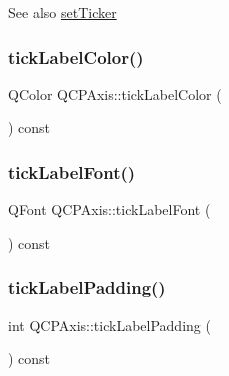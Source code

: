 \begin{DoxySeeAlso}{See also}
\mbox{\hyperlink{class_q_c_p_axis_a4ee03fcd2c74d05cd1a419b9af5cfbdc}{set\+Ticker}} 
\end{DoxySeeAlso}
\mbox{\label{class_q_c_p_axis_a9e21b2326bb2de0b7a8efcd1efc0ce78}} 
\subsubsection{\texorpdfstring{tickLabelColor()}{tickLabelColor()}}
{\footnotesize\ttfamily Q\+Color Q\+C\+P\+Axis\+::tick\+Label\+Color (\begin{DoxyParamCaption}{ }\end{DoxyParamCaption}) const\hspace{0.3cm}{\ttfamily [inline]}}

\mbox{\label{class_q_c_p_axis_a09f339b7125cf1094920f86687b88236}} 
\subsubsection{\texorpdfstring{tickLabelFont()}{tickLabelFont()}}
{\footnotesize\ttfamily Q\+Font Q\+C\+P\+Axis\+::tick\+Label\+Font (\begin{DoxyParamCaption}{ }\end{DoxyParamCaption}) const\hspace{0.3cm}{\ttfamily [inline]}}

\mbox{\label{class_q_c_p_axis_afac7316ca35941e7080f98e0022c1891}} 
\subsubsection{\texorpdfstring{tickLabelPadding()}{tickLabelPadding()}}
{\footnotesize\ttfamily int Q\+C\+P\+Axis\+::tick\+Label\+Padding (\begin{DoxyParamCaption}{ }\end{DoxyParamCaption}) const}

\mbox{\label{class_q_c_p_axis_a5c81e5d550266fdb9e11d96d1dc5713e}} 
